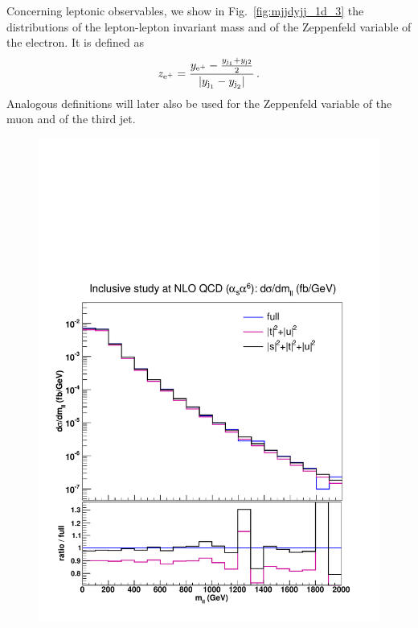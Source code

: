 Concerning leptonic observables, we show in Fig.~\ref{fig:mjjdyjj_1d_3} the distributions of the lepton-lepton invariant mass and of the Zeppenfeld variable of the electron. 
It is defined as
%
\begin{equation}
  z_{\text{e}^+} = \frac{y_{\text{e}^+}-\frac{y_{\text{j}_1}+y_{\text{j}2}}2}{|y_{\text{j}_1}-y_{\text{j}_2}|} \,.
  \label{eq:Zeppenfeld}
\end{equation}
%
Analogous definitions will later also be used for the Zeppenfeld variable of the muon and of the third jet.
%
\begin{figure}[hbt]
\centering
{\includegraphics[scale=0.35]{figures/scanfigures/mll_nlo.pdf}}

\end{figure}
